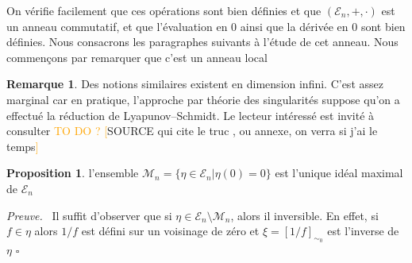 \documentclass[a4paper,12pt,oneside,titlepage]{article}
\newcommand{\todomaybe}[1]{\textcolor{orange}{TO DO ? [}#1\textcolor{orange}{]}}
\theoremstyle{definition}
\newtheorem{proposition}[definition]{Proposition}
\newtheorem{remarque}[definition]{Remarque}
\theoremstyle{plain}
\newenvironment{preuve}
{\par\noindent\textit{Preuve.}\ }
{\hfill$\square$\par}
\begin{document}
On vérifie facilement que ces opérations sont bien définies et que $(\mathcal{E}_n,+,\cdot)$ est un anneau commutatif, et que l'évaluation en 0 ainsi que la dérivée en 0 sont bien définies. Nous consacrons les paragraphes suivants à l'étude de cet anneau. Nous commençons par remarquer que c'est un anneau local
\begin{remarque}
    Des notions similaires existent en dimension infini. C'est assez marginal car en pratique, l'approche par théorie des singularités suppose qu'on a effectué la réduction de  Lyapunov–Schmidt. Le lecteur intéressé est invité à consulter \todomaybe{SOURCE qui cite le truc , ou annexe, on verra si j'ai le temps}
\end{remarque}
\begin{proposition}
    l'ensemble $\mathcal{M}_n=\{\eta\in\mathcal{E}_n | \eta(0)=0\}$ est l'unique idéal maximal de $\mathcal{E}_n$
\end{proposition}
\begin{preuve}
Il suffit d'observer que si $\eta\in\mathcal{E}_n\setminus\mathcal{M}_n$, alors il inversible. En effet, si $f\in\eta$ alors $1/f$ est défini sur un voisinage de zéro et $\xi=[1/f]_{\sim_0}$ est l'inverse de $\eta$
\end{preuve}
\end{document}
